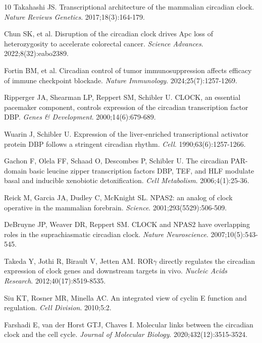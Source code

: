 \documentclass[11pt,letterpaper]{article}
\begin{document}

\begin{thebibliography}{10}
Takahashi JS. Transcriptional architecture of the mammalian circadian clock. \textit{Nature Reviews Genetics}. 2017;18(3):164-179.

Chun SK, et al. Disruption of the circadian clock drives Apc loss of heterozygosity to accelerate colorectal cancer. \textit{Science Advances}. 2022;8(32):eabo2389.

Fortin BM, et al. Circadian control of tumor immunosuppression affects efficacy of immune checkpoint blockade. \textit{Nature Immunology}. 2024;25(7):1257-1269.

Ripperger JA, Shearman LP, Reppert SM, Schibler U. CLOCK, an essential pacemaker component, controls expression of the circadian transcription factor DBP. \textit{Genes \& Development}. 2000;14(6):679-689.

Wuarin J, Schibler U. Expression of the liver-enriched transcriptional activator protein DBP follows a stringent circadian rhythm. \textit{Cell}. 1990;63(6):1257-1266.

Gachon F, Olela FF, Schaad O, Descombes P, Schibler U. The circadian PAR-domain basic leucine zipper transcription factors DBP, TEF, and HLF modulate basal and inducible xenobiotic detoxification. \textit{Cell Metabolism}. 2006;4(1):25-36.

Reick M, Garcia JA, Dudley C, McKnight SL. NPAS2: an analog of clock operative in the mammalian forebrain. \textit{Science}. 2001;293(5529):506-509.

DeBruyne JP, Weaver DR, Reppert SM. CLOCK and NPAS2 have overlapping roles in the suprachiasmatic circadian clock. \textit{Nature Neuroscience}. 2007;10(5):543-545.

Takeda Y, Jothi R, Birault V, Jetten AM. ROR$\gamma$ directly regulates the circadian expression of clock genes and downstream targets in vivo. \textit{Nucleic Acids Research}. 2012;40(17):8519-8535.

Siu KT, Rosner MR, Minella AC. An integrated view of cyclin E function and regulation. \textit{Cell Division}. 2010;5:2.

Farshadi E, van der Horst GTJ, Chaves I. Molecular links between the circadian clock and the cell cycle. \textit{Journal of Molecular Biology}. 2020;432(12):3515-3524.
\end{thebibliography}
\end{document}
